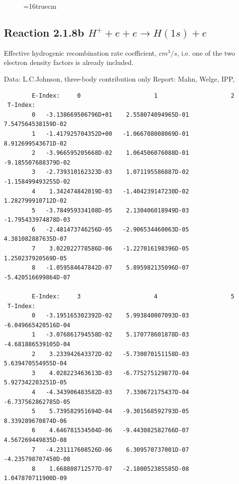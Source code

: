 \documentclass[12pt,dvipdfmx]{article}
\begin{document}
\begin{figure} \label{2.1.8a}
\epsfxsize=16truecm
\end{figure}
\newpage

\subsection{
  Reaction 2.1.8b  $H^+ + e + e \rightarrow H(1s) + e$
}

   Effective hydrogenic recombination rate coefficient, $cm^3/s$,
   i.e. one of the two electron density factors is already included.

   Data: L.C.Johnson, three-body contribution only
   Report: Mahn, Welge, IPP, \cite{kn:Mahn}



\begin{small}\begin{verbatim}
        E-Index:     0                     1                     2
 T-Index:
        0   -3.138669506796D+01    2.558074094965D-01    7.547564538159D-02
        1   -1.417925704352D+00   -1.066708008069D-01    8.912699543671D-02
        2   -3.966595205668D-02    1.064506076088D-01   -9.185507688379D-02
        3   -2.739310162323D-03    1.071195586887D-02   -1.158499493255D-02
        4    1.342474842019D-03   -1.404239147230D-02    1.282799910712D-02
        5   -3.784959334108D-05    2.130406018949D-03   -1.795433974878D-03
        6   -2.481473746256D-05   -2.906534460063D-05    4.381082887635D-07
        7    3.022022778586D-06   -1.227016198396D-05    1.250237920569D-05
        8   -1.059584647842D-07    5.895982135096D-07   -5.420516699864D-07

        E-Index:     3                     4                     5
 T-Index:
        0   -3.195165302392D-02    5.993840007093D-03   -6.049665420516D-04
        1   -3.076861794558D-02    5.170778601878D-03   -4.681886539105D-04
        2    3.233942643372D-02   -5.730070151158D-03    5.639470554955D-04
        3    4.028223463613D-03   -6.775275129877D-04    5.927342203251D-05
        4   -4.343906483582D-03    7.330672175437D-04   -6.737562862785D-05
        5    5.739582951694D-04   -9.301568592793D-05    8.339289670874D-06
        6    4.646781534504D-06   -9.443082582766D-07    4.567269449835D-08
        7   -4.231117608526D-06    6.309570737001D-07   -4.235798707450D-08
        8    1.668808712577D-07   -2.180052385585D-08    1.047870711900D-09


\end{verbatim}
\end{small}
\end{document}
